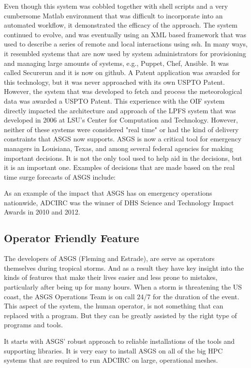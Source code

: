 \documentclass{article}
\begin{document}
Even though this system was cobbled together with shell scripts and a very
cumbersome Matlab environment that was difficult to incorporate into an
automated workflow, it demonstrated the efficacy of the approach. The system
continued to evolve, and was eventually using an XML based framework that was
used to describe a series of remote and local interactions using ssh. In many
ways, it resembled systems that are now used by system administrators for
provisioning and managing large amounts of systems, e.g., Puppet, Chef, Ansible.
It was called Securerun and it is now on github\cite{Securerun}. A Patent
application was awarded for this technology, but it was never approached with
its own USPTO Patent\cite{SecurerunUSPTO}. However, the system that was developed to fetch and
process the meteorological data was awarded a USPTO Patent.  This experience
with the OIF system directly impacted the architecture and approach of the LPFS
system that was developed in 2006 at LSU's Center for Computation and
Technology. However, neither of these systems were considered "real time" or had
the kind of delivery constraints that ASGS now supports.  ASGS is now a critical
tool for emergency managers in Louisiana, Texas, and among several federal
agencies for making important decisions. It is not the only tool used to help
aid in the decisions, but it is an important one.  Examples of decisions that
are made based on the real time surge forecasts of ASGS include:

As an example of the impact that ASGS has on emergency operations nationwide,
ADCIRC was the winner of DHS Science and Technology Impact Awards in 2010 and
2012\cite{crc-adcirc-factsheet}.

\subsection{Operator Friendly Feature}

The developers of ASGS (Fleming and Estrade), are serve as operators themselves
during tropical storms. And as a result they have key insight into the kinds of
features that make their lives easier and less prone to mistakes, particularly
after being up for many hours. When a storm is threatening the US coast, the
ASGS Operations Team is on call 24/7 for the duration of the event. This aspect
of the system, the human operator, is not something that can replaced with a
program. But they can be greatly assisted by the right type of programs and
tools.

It starts with ASGS' robust approach to reliable installations of the tools and
supporting libraries. It is very easy to install ASGS on all of the big HPC
systems that are required to run ADCIRC on large, operational meshes.
\end{document}
